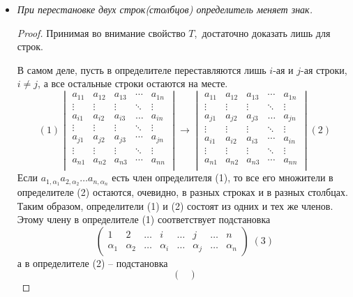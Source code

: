 \documentclass[a4paper, 12pt]{article}
\begin{document}
\begin{itemize}
\item 
\textit{При перестановке двух строк(столбцов) определитель меняет знак.} 
\begin{proof}
Принимая во внимание свойство $T$,\ достаточно доказать лишь для строк.

В самом деле, пусть в определителе переставляются лишь $i$-ая и $j$-ая строки,\ $i\ne j$, а все остальные строки остаются на месте. 
\[ (1)
\begin{vmatrix}
a_{11} & a_{12} & a_{13} & \cdots & a_{1n}\\
\vdots & \vdots & \vdots & \ddots & \vdots\\
a_{i1} & a_{i2} & a_{i3} & \ldots & a_{in}\\
\vdots & \vdots & \vdots & \ddots & \vdots\\
a_{j1} & a_{j2} & a_{j3} & \cdots & a_{jn}\\
\vdots & \vdots & \vdots &\ddots & \vdots\\
a_{n1} & a_{n2} & a_{n3} & \cdots & a_{nn}\\
\end{vmatrix} \to
\begin{vmatrix}
a_{11} & a_{12} & a_{13} & \cdots & a_{1n}\\
\vdots & \vdots & \vdots & \ddots & \vdots\\
a_{j1} & a_{j2} & a_{j3} & \ldots & a_{jn}\\
\vdots & \vdots & \vdots & \ddots & \vdots\\
a_{i1} & a_{i2} & a_{i3} & \cdots & a_{in}\\
\vdots & \vdots & \vdots &\ddots & \vdots\\
a_{n1} & a_{n2} & a_{n3} & \cdots & a_{nn}\\
\end{vmatrix}
(2)
\]
Если $a_{1,\alpha_1} a_{2,\alpha_2}\ldots a_{n,\alpha_n}$ есть член определителя (1), то все его множители в определителе (2) остаются, очевидно, в разных строках и в разных столбцах. Таким образом, определители (1) и (2) состоят из одних и тех же членов. Этому члену в определителе (1) соответствует подстановка
\[
\begin{pmatrix}
1 & 2 & \ldots & i & \ldots & j & \ldots & n\\
\alpha_1 & \alpha_2 & \ldots & \alpha_i & \ldots & \alpha_j & \ldots  & \alpha_n
\end{pmatrix} \; (3)
\]
а в определителе (2) -- подстановка
\[
\begin{pmatrix}

\end{pmatrix}\]
\end{proof}
\end{itemize}
\end{document}
